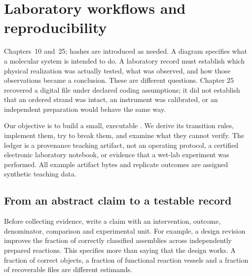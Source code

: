 \chapter{Laboratory workflows and reproducibility}
\label{dnad26:chapter}
{Chapters~10 and~25; hashes are introduced as needed.}
A diagram specifies what a molecular system is intended to do. A laboratory record
must establish which physical realization was actually tested, what was observed,
and how those observations became a conclusion. These are different questions.
Chapter 25 recovered a digital file under declared coding assumptions; it did not
establish that an ordered strand was intact, an instrument was calibrated, or an
independent preparation would behave the same way.

Our objective is to build a small, executable . We derive its
transition rules, implement them, try to break them, and examine what they cannot
verify. The ledger is a provenance teaching artifact, not an operating protocol,
a certified electronic laboratory notebook, or evidence that a wet-lab experiment
was performed. All example artifact bytes and replicate outcomes are assigned
synthetic teaching data.

\section{From an abstract claim to a testable record}
Before collecting evidence, write a claim with an intervention, outcome,
denominator, comparison and experimental unit. For example, a design revision
improves the fraction of correctly classified assemblies across independently
prepared reactions. This specifies more than saying that the design works.
A fraction of correct objects, a fraction of functional reaction vessels and
a fraction of recoverable files are different estimands.

